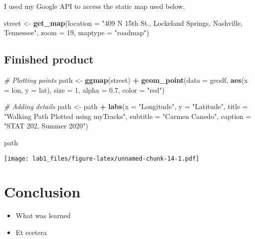 \documentclass[
]{article}
\newenvironment{Shaded}{\begin{snugshade}}{\end{snugshade}}
\newcommand{\CommentTok}[1]{\textcolor[rgb]{0.56,0.35,0.01}{\textit{#1}}}
\newcommand{\DataTypeTok}[1]{\textcolor[rgb]{0.13,0.29,0.53}{#1}}
\newcommand{\DecValTok}[1]{\textcolor[rgb]{0.00,0.00,0.81}{#1}}
\newcommand{\FloatTok}[1]{\textcolor[rgb]{0.00,0.00,0.81}{#1}}
\newcommand{\KeywordTok}[1]{\textcolor[rgb]{0.13,0.29,0.53}{\textbf{#1}}}
\newcommand{\NormalTok}[1]{#1}
\newcommand{\OperatorTok}[1]{\textcolor[rgb]{0.81,0.36,0.00}{\textbf{#1}}}
\newcommand{\StringTok}[1]{\textcolor[rgb]{0.31,0.60,0.02}{#1}}
\providecommand{\tightlist}{%
  \setlength{\itemsep}{0pt}\setlength{\parskip}{0pt}}
\begin{document}
I used my Google API to access the static map used below.

\begin{Shaded}
\begin{Highlighting}[]
\NormalTok{street <-}\StringTok{ }\KeywordTok{get_map}\NormalTok{(}\DataTypeTok{location =} \StringTok{"409 N 15th St., Lockeland Springs, Nashville, Tennessee"}\NormalTok{,}
                  \DataTypeTok{zoom =} \DecValTok{19}\NormalTok{,}
                  \DataTypeTok{maptype =} \StringTok{"roadmap"}\NormalTok{)}
\end{Highlighting}
\end{Shaded}

\hypertarget{finished-product}{%
\subsection{Finished product}\label{finished-product}}

\begin{Shaded}
\begin{Highlighting}[]
\CommentTok{# Plotting points}
\NormalTok{path <-}\StringTok{ }\KeywordTok{ggmap}\NormalTok{(street) }\OperatorTok{+}
\StringTok{  }\KeywordTok{geom_point}\NormalTok{(}\DataTypeTok{data =}\NormalTok{ geodf,}
             \KeywordTok{aes}\NormalTok{(}\DataTypeTok{x =}\NormalTok{ lon, }\DataTypeTok{y =}\NormalTok{ lat),}
             \DataTypeTok{size =} \DecValTok{1}\NormalTok{,}
             \DataTypeTok{alpha =} \FloatTok{0.7}\NormalTok{,}
             \DataTypeTok{color =} \StringTok{"red"}\NormalTok{)}

\CommentTok{# Adding details}
\NormalTok{path <-}\StringTok{ }\NormalTok{path }\OperatorTok{+}
\StringTok{  }\KeywordTok{labs}\NormalTok{(}\DataTypeTok{x =} \StringTok{"Longitude"}\NormalTok{,}
       \DataTypeTok{y =} \StringTok{"Latitude"}\NormalTok{,}
       \DataTypeTok{title =} \StringTok{"Walking Path Plotted using myTracks"}\NormalTok{,}
       \DataTypeTok{subtitle =} \StringTok{"Carmen Canedo"}\NormalTok{,}
       \DataTypeTok{caption =} \StringTok{"STAT 202, Summer 2020"}\NormalTok{)}

\NormalTok{path}
\end{Highlighting}
\end{Shaded}

\texttt{[image: lab1\_files/figure-latex/unnamed-chunk-14-1.pdf]}

\hypertarget{conclusion}{%
\section{Conclusion}\label{conclusion}}

\begin{itemize}
\tightlist
\item
  What was learned
\item
  Et ecetera
\end{itemize}
\end{document}
